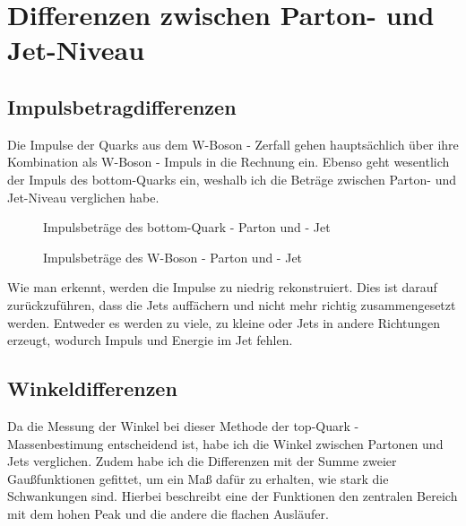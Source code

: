 \documentclass[
a4paper,                                %
twoside,                                %
BCOR1.4cm,                      %
ngerman,                                %
10pt,                           %
headings=normal,                %
headsepline,                    %
clearplainpage, %
final,                                  %
div=14,
parskip=full
]{scrbook}
\begin{document}
\newpage

\section{Differenzen zwischen Parton- und Jet-Niveau}

\subsection{Impulsbetragdifferenzen}

Die Impulse der Quarks aus dem W-Boson - Zerfall gehen haupts\"achlich \"uber ihre Kombination als W-Boson - Impuls in die Rechnung ein. Ebenso geht wesentlich der Impuls des bottom-Quarks ein, weshalb ich die Betr\"age zwischen Parton- und Jet-Niveau verglichen habe. 

\begin{figure}[h]
	\caption{Impulsbetr\"age des bottom-Quark - Parton und - Jet}
	\caption{Impulsbetr\"age des W-Boson - Parton und - Jet}
\end{figure}

Wie man erkennt, werden die Impulse zu niedrig rekonstruiert. Dies ist darauf zur\"uckzuf\"uhren, dass die Jets auff\"achern und nicht mehr richtig zusammengesetzt werden. Entweder es werden zu viele, zu kleine oder Jets in andere Richtungen erzeugt, wodurch Impuls und Energie im Jet fehlen. 

\subsection{Winkeldifferenzen}

Da die Messung der Winkel bei dieser Methode der top-Quark - Massenbestimung entscheidend ist, habe ich die Winkel zwischen Partonen und Jets verglichen. Zudem habe ich die Differenzen mit der Summe zweier Gau\ss funktionen gefittet, um ein Ma\ss\;  daf\"ur zu erhalten, wie stark die Schwankungen sind. Hierbei beschreibt eine der Funktionen den zentralen Bereich mit dem hohen Peak und die andere die flachen Ausl\"aufer.

\newpage
\end{document}

